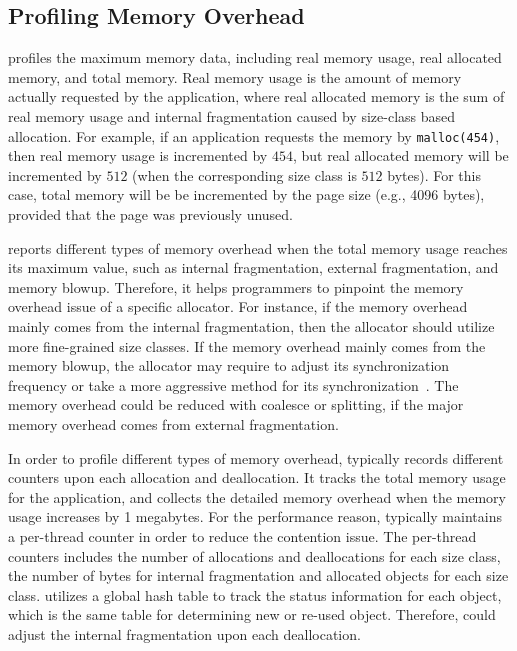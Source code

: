 \subsection{Profiling Memory Overhead}
\MP{} profiles the maximum memory data, including real memory usage, real allocated memory, and total memory. Real memory usage is the amount of memory actually requested  by the application, where real allocated memory is the sum of real memory usage and internal fragmentation caused by size-class based allocation. For example, if an application requests the memory by \texttt{malloc(454)}, then real memory usage is incremented by $454$, but real allocated memory will be incremented by $512$ (when the corresponding size class is $512$ bytes). For this case, total memory will be  be incremented by the page size (e.g., 4096 bytes), provided that the page was previously unused. 

\MP{} reports different types of memory overhead when the total memory usage reaches its maximum value, such as internal fragmentation, external fragmentation, and memory blowup. 
Therefore, it helps programmers to pinpoint the memory overhead issue of a specific allocator. For instance, if the memory overhead mainly comes from the internal fragmentation, then the allocator should utilize more fine-grained size classes. If the memory overhead mainly comes from the memory blowup, the allocator may require to adjust its synchronization frequency or take a more aggressive method for its synchronization~\cite{DBLP:conf/iwmm/LiLD19}. The memory overhead could be reduced with coalesce or splitting, if the major memory overhead comes from external fragmentation. 

In order to profile different types of memory overhead, \MP{} typically records different counters upon each allocation and deallocation. It tracks the total memory usage for the application, and collects the detailed memory overhead when the memory usage increases by 1 megabytes. For the performance reason, \MP{} typically maintains a per-thread counter in order to reduce the contention issue. The per-thread counters includes the number of allocations and deallocations for each size class, the number of bytes for internal fragmentation  and allocated objects for each size class. 
\MP{} utilizes a global hash table to track the status information for each object, which is the same table for determining new or re-used object. Therefore, \MP{} could adjust the internal fragmentation upon each deallocation. 

